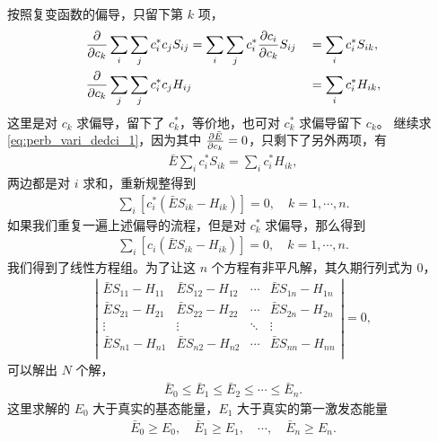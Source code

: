 按照复变函数的偏导，只留下第 $k$ 项，
\begin{alignat}{2}
    &\pdv{c_k} \sum_i \sum_j c_i^* c_j S_{ij} = \sum_i \sum_j c_i^* \pdv{c_i}{c_k} S_{ij} &&= \sum_i c_i^* S_{ik}, \\
    &\pdv{c_k} \sum_j \sum_j c_i^* c_j H_{ij} &&= \sum_i c_i^* H_{ik}, 
\end{alignat}
这里是对 $c_k$ 求偏导，留下了 $c_k^*$，等价地，也可对 $c_k^*$ 求偏导留下 $c_k$。
继续求 \eqref{eq:perb_vari_dedci_1}，因为其中 $\pdv{\bar E}{c_k} =0$，只剩下了另外两项，有
\begin{align}
    \bar E \sum_i c_i^* S_{ik} = \sum_i c_i^* H_{ik},
\end{align}
两边都是对 $i$ 求和，重新规整得到
\begin{align}
    \sum_i  [c_i^* \left(\bar E S_{ik} - H_{ik}\right)] = 0, \quad k = 1, \cdots, n. 
\end{align}
如果我们重复一遍上述偏导的流程，但是对 $c_k^*$ 求偏导，那么得到
\begin{align}
    \sum_i  [c_i \left(\bar E S_{ik} - H_{ik}\right)] = 0, \quad k = 1, \cdots, n. 
\end{align}
我们得到了线性方程组。为了让这 $n$ 个方程有非平凡解，其久期行列式为 0，
\begin{align}
    \left|
        \begin{matrix}
            \bar E S_{11} - H_{11} & \bar E S_{12} - H_{12} & \cdots & \bar E S_{1n} - H_{1n} \\
            \bar E S_{21} - H_{21} & \bar E S_{22} - H_{22} & \cdots & \bar E S_{2n} - H_{2n} \\
            \vdots & \vdots & \ddots & \vdots \\
            \bar E S_{n1} - H_{n1} & \bar E S_{n2} - H_{n2} & \cdots & \bar E S_{nn} - H_{nn} \\
        \end{matrix}
    \right| = 0,
\end{align}
可以解出 $N$ 个解，
\begin{align}
    \bar E_0 \leqslant \bar E_1 \leqslant \bar E_2 \leqslant \cdots \leqslant \bar E_n. 
\end{align}
这里求解的 $E_0$ 大于真实的基态能量，$E_1$ 大于真实的第一激发态能量
\begin{align}
    \bar E_0 \geqslant E_0, \quad \bar E_1 \geqslant E_1, \quad \cdots, \quad \bar E_n \geqslant E_n. 
\end{align}


